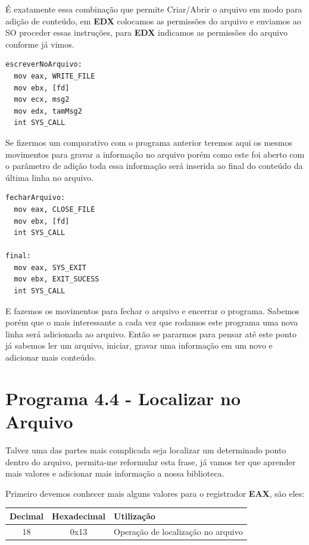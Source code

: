 É exatamente essa combinação que permite Criar/Abrir o arquivo em modo para adição de conteúdo, em \textbf{EDX} colocamos as permissões do arquivo e enviamos ao SO proceder essas instruções, para \textbf{EDX} indicamos as permissões do arquivo conforme já vimos.

\begin{lstlisting}[]
escreverNoArquivo:
  mov eax, WRITE_FILE
  mov ebx, [fd]
  mov ecx, msg2
  mov edx, tamMsg2
  int SYS_CALL 	
\end{lstlisting}	

Se fizermos um comparativo com o programa anterior teremos aqui os mesmos movimentos para gravar a informação no arquivo porém como este foi aberto com o parâmetro de adição toda essa informação será inserida ao final do conteúdo da última linha no arquivo.

\begin{lstlisting}[]
fecharArquivo:
  mov eax, CLOSE_FILE
  mov ebx, [fd]
  int SYS_CALL    

final:
  mov eax, SYS_EXIT
  mov ebx, EXIT_SUCESS
  int SYS_CALL 	
\end{lstlisting}	

E fazemos os movimentos para fechar o arquivo e encerrar o programa. Sabemos porém que o mais interessante a cada vez que rodamos este programa uma nova linha será adicionada ao arquivo. Então se pararmos para pensar até este ponto já sabemos ler um arquivo, iniciar, gravar uma informação em um novo e adicionar mais conteúdo.

\section{Programa 4.4 - Localizar no Arquivo}
Talvez uma das partes mais complicada seja localizar um determinado ponto dentro do arquivo, permita-me reformular esta frase, já vamos ter que aprender mais valores e adicionar mais informação a nossa biblioteca.

Primeiro devemos conhecer mais alguns valores para o registrador \textbf{EAX}, são eles:
\begin{table}[H]
	\centering 
	\begin{tabular}{c | c | l }
		\textbf{Decimal} & \textbf{Hexadecimal} & \textbf{Utilização} \\ \hline 
		18 & 0x13 & Operação de localização no arquivo
	\end{tabular}
\end{table}

